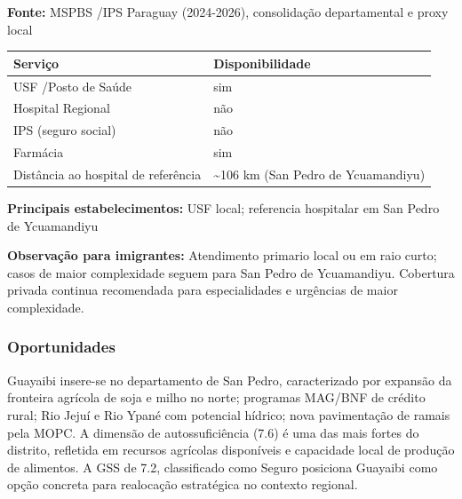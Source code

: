 \textbf{Fonte:} MSPBS /\allowbreak  IPS Paraguay (2024-2026), consolidação
departamental e proxy local

{\def\LTcaptype{none} %
\begin{longtable}[]{@{}
  >{\raggedright\arraybackslash}p{}
  >{\raggedright\arraybackslash}p{}@{}}
\toprule\noalign{}
\begin{minipage}[b]{\linewidth}\raggedright
Serviço
\end{minipage} & \begin{minipage}[b]{\linewidth}\raggedright
Disponibilidade
\end{minipage} \\
\midrule\noalign{}
\endhead
\bottomrule\noalign{}
\endlastfoot
USF /\allowbreak  Posto de Saúde & sim \\
Hospital Regional & não \\
IPS (seguro social) & não \\
Farmácia & sim \\
Distância ao hospital de referência & \textasciitilde106 km (San Pedro
de Ycuamandiyu) \\
\end{longtable}
}

\textbf{Principais estabelecimentos:} USF local; referencia hospitalar
em San Pedro de Ycuamandiyu

\textbf{Observação para imigrantes:} Atendimento primario local ou em
raio curto; casos de maior complexidade seguem para San Pedro de
Ycuamandiyu. Cobertura privada continua recomendada para especialidades
e urgências de maior complexidade.
\newpage

\subsubsection*{Oportunidades}\label{oport-guayaibi-0206}
Guayaibi insere-se no departamento de San Pedro, caracterizado por expansão da fronteira agrícola de soja e milho no norte; programas MAG/BNF de crédito rural; Rio Jejuí e Rio Ypané com potencial hídrico; nova pavimentação de ramais pela MOPC. A dimensão de autossuficiência (7.6) é uma das mais fortes do distrito, refletida em recursos agrícolas disponíveis e capacidade local de produção de alimentos. A GSS de 7.2, classificado como Seguro posiciona Guayaibi como opção concreta para realocação estratégica no contexto regional.

